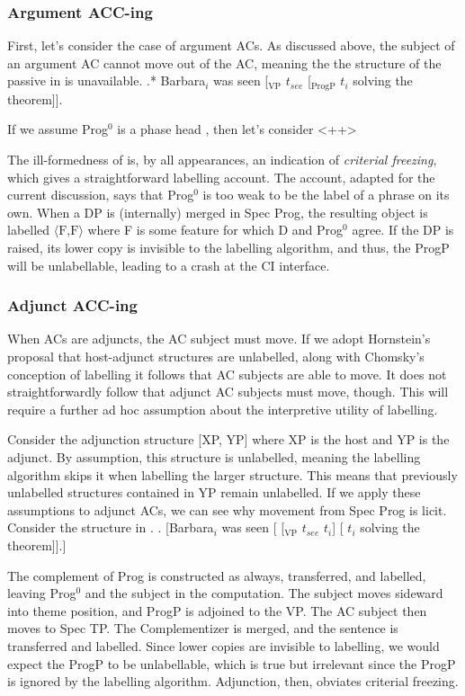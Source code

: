 \documentclass[letterpaper]{article}
\begin{document}
\subsubsection{Argument ACC-ing}
First, let's consider the case of argument ACs.
As discussed above, the subject of an argument AC cannot move out of the AC, meaning the the structure of the passive in \Next is unavailable.
\ex.* Barbara$_i$ was seen [$_\text{VP}$ $t_{see}$ [$_\text{ProgP}$ $t_i$  solving the theorem]].

If we assume Prog$^0$ is a phase head \parencite{harwood2015being}, then let's consider <++>

The ill-formedness of \Last is, by all appearances, an indication of \textit{criterial freezing}, which \textcite{chomsky2015problems} gives a straightforward labelling account.
The account, adapted for the current discussion, says that Prog$^0$ is too weak to be the label of a phrase on its own.
When a DP is (internally) merged in Spec Prog, the resulting object is labelled $\langle\text{F,F}\rangle$ where F is some feature for which D and Prog$^0$ agree.
If the DP is raised, its lower copy is invisible to the labelling algorithm, and thus, the ProgP will be unlabellable, leading to a crash at the CI interface.

\subsubsection{Adjunct ACC-ing}
When ACs are adjuncts, the AC subject must move.
If we adopt Hornstein's proposal that host-adjunct structures are unlabelled, along with Chomsky's conception of labelling it follows that AC subjects are able to move.
It does not straightforwardly follow that adjunct AC subjects must move, though.
This will require a further ad hoc assumption about the interpretive utility of labelling.

Consider the adjunction structure [XP, YP] where XP is the host and YP is the adjunct.
By assumption, this structure is unlabelled, meaning the labelling algorithm skips it when labelling the larger structure.
This means that previously unlabelled structures contained in YP remain unlabelled.
If we apply these assumptions to adjunct ACs, we can see why movement from Spec Prog is licit.
Consider the structure in \Next.
\ex. [Barbara$_i$ was seen [ [$_\text{VP}$ $t_{see}$ $t_i$] [ $t_i$ solving the theorem]].]

The complement of Prog is constructed as always, transferred, and labelled, leaving Prog$^0$ and the subject in the computation.
The subject moves sideward into theme position, and ProgP is adjoined to the VP.
The AC subject then moves to Spec TP.
The Complementizer is merged, and the sentence is transferred and labelled.
Since lower copies are invisible to labelling, we would expect the ProgP to be unlabellable, which is true but irrelevant since the ProgP is ignored by the labelling algorithm.
Adjunction, then, obviates criterial freezing.
\end{document}

